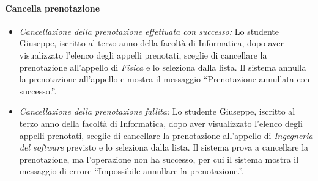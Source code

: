 \paragraph{Cancella prenotazione}
\begin{itemize}
	\item \textit{Cancellazione della prenotazione effettuata con successo:}
	Lo studente Giuseppe, iscritto al terzo anno della facoltà di Informatica, dopo aver visualizzato l'elenco degli appelli prenotati, sceglie di cancellare la prenotazione all’appello di \textit{Fisica} e lo seleziona dalla lista. Il sistema annulla la prenotazione all’appello e mostra il messaggio “Prenotazione annullata con successo.”.
	
	\item \textit{Cancellazione della prenotazione fallita:}
	Lo studente Giuseppe, iscritto al terzo anno della facoltà di Informatica, dopo aver visualizzato l'elenco degli appelli prenotati, sceglie di cancellare la prenotazione all’appello di \textit{Ingegneria del software} previsto e lo seleziona dalla lista. Il sistema prova a cancellare la prenotazione, ma l’operazione non ha successo, per cui il sistema mostra il messaggio di errore “Impossibile annullare la prenotazione.”.
\end{itemize}
